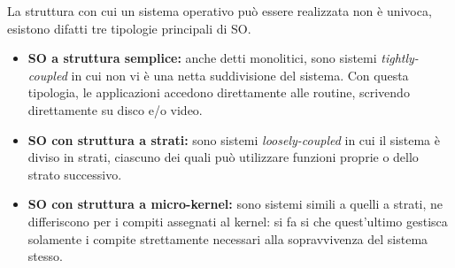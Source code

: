 La struttura con cui un sistema operativo può essere realizzata non è univoca, esistono difatti tre tipologie principali di SO.
\begin{itemize}
    \item \textbf{SO a struttura semplice:} anche detti monolitici, sono sistemi \emph{tightly-coupled} in cui non vi è una netta suddivisione del sistema.
          Con questa tipologia, le applicazioni accedono direttamente alle routine, scrivendo direttamente su disco e/o video.

    \item \textbf{SO con struttura a strati:} sono sistemi \emph{loosely-coupled} in cui il sistema è diviso in strati,
          ciascuno dei quali può utilizzare funzioni proprie o dello strato successivo.

    \item \textbf{SO con struttura a micro-kernel:} sono sistemi simili a quelli a strati, ne differiscono per i compiti assegnati al kernel:
          si fa si che quest'ultimo gestisca solamente i compite strettamente necessari alla sopravvivenza del sistema stesso.
\end{itemize}